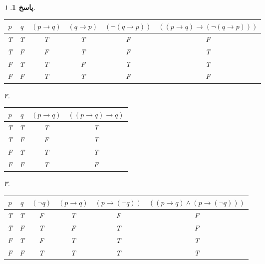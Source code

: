 \documentclass[a4paper,12pt]{article}
\theoremstyle{exercise}
\newtheorem{solution}{پاسخ}
\begin{document}
	\begin{solution}
			۱.
		\begin{latin}
			\begin{table}[H]
				\centering
				\begin{tabular}{c|c|c|c|c|c}
					$p$ & $q$ & $(p \rightarrow q)$ & $(q \rightarrow p)$ & $(\neg(q \rightarrow p))$ & $((p \rightarrow q) \rightarrow (\neg(q \rightarrow p)))$ \\
					\hline
					T & T & T & T & F & F \\
					T & F & F & T & F & T \\
					F & T & T & F & T & T \\
					F & F & T & T & F & F \\
				\end{tabular}
			\end{table}
		\end{latin}
		
		\noindent
		۲.
		\begin{latin}
			\begin{table}[H]
				\centering
				\begin{tabular}{c|c|c|c}
					$p$ & $q$ & $(p \rightarrow q)$ & $((p \rightarrow q) \rightarrow q)$ \\
					\hline
					T & T & T & T \\
					T & F & F & T \\
					F & T & T & T \\
					F & F & T & F \\
				\end{tabular}
			\end{table}
		\end{latin}
		
		\noindent
		۳.
		\begin{latin}
			\begin{table}[H]
				\centering
				\begin{tabular}{c|c|c|c|c|c}
					$p$ & $q$ & $(\neg q)$ & $(p \rightarrow q)$ & $(p \rightarrow (\neg q))$ & $((p \rightarrow q) \wedge (p \rightarrow (\neg q)))$ \\
					\hline
					T & T & F & T & F & F \\
					T & F & T & F & T & F \\
					F & T & F & T & T & T \\
					F & F & T & T & T & T \\
				\end{tabular}
			\end{table}
		\end{latin}
		

\end{solution}
\end{document}
